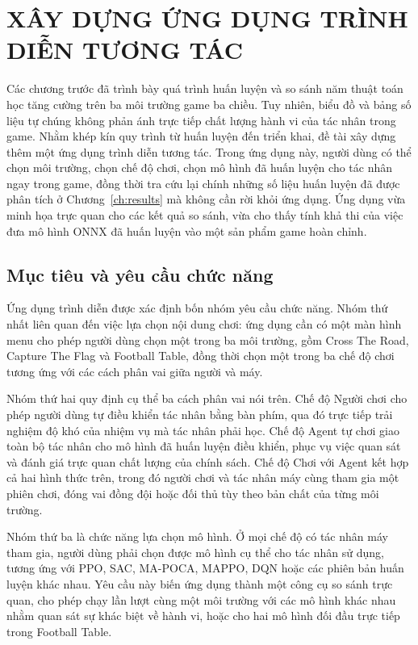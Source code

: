 \fontsize{13pt}{22.5pt}\selectfont

\clearpage
\section{XÂY DỰNG ỨNG DỤNG TRÌNH DIỄN TƯƠNG TÁC}
\label{ch:app}

\indent Các chương trước đã trình bày quá trình huấn luyện và so sánh năm thuật toán học
tăng cường trên ba môi trường game ba chiều. Tuy nhiên, biểu đồ và bảng số liệu tự chúng
không phản ánh trực tiếp chất lượng hành vi của tác nhân trong game. Nhằm khép kín quy
trình từ huấn luyện đến triển khai, đề tài xây dựng thêm một ứng dụng trình diễn tương
tác. Trong ứng dụng này, người dùng có thể chọn môi trường, chọn chế độ chơi, chọn mô hình
đã huấn luyện cho tác nhân ngay trong game, đồng thời tra cứu lại chính những số liệu
huấn luyện đã được phân tích ở Chương~\ref{ch:results} mà không cần rời khỏi ứng dụng. Ứng
dụng vừa minh họa trực quan cho các kết quả so sánh, vừa cho thấy tính khả thi của việc
đưa mô hình ONNX đã huấn luyện vào một sản phẩm game hoàn chỉnh.

\subsection{Mục tiêu và yêu cầu chức năng}
\label{sub:app-goal}

\indent Ứng dụng trình diễn được xác định bốn nhóm yêu cầu chức năng. Nhóm thứ nhất liên
quan đến việc lựa chọn nội dung chơi: ứng dụng cần có một màn hình menu cho phép người
dùng chọn một trong ba môi trường, gồm Cross The Road, Capture The Flag và Football Table,
đồng thời chọn một trong ba chế độ chơi tương ứng với các cách phân vai giữa người và máy.

\indent Nhóm thứ hai quy định cụ thể ba cách phân vai nói trên. Chế độ Người chơi
cho phép người dùng tự điều khiển tác nhân bằng bàn phím, qua đó trực tiếp trải nghiệm độ
khó của nhiệm vụ mà tác nhân phải học. Chế độ Agent tự chơi giao toàn bộ tác nhân
cho mô hình đã huấn luyện điều khiển, phục vụ việc quan sát và đánh giá trực quan chất
lượng của chính sách. Chế độ Chơi với Agent kết hợp cả hai hình thức trên, trong
đó người chơi và tác nhân máy cùng tham gia một phiên chơi, đóng vai đồng đội hoặc đối thủ
tùy theo bản chất của từng môi trường.

\indent Nhóm thứ ba là chức năng lựa chọn mô hình. Ở mọi chế độ có tác nhân máy tham gia,
người dùng phải chọn được mô hình cụ thể cho tác nhân sử dụng, tương ứng với PPO, SAC,
MA-POCA, MAPPO, DQN hoặc các phiên bản huấn luyện khác nhau. Yêu cầu này biến ứng dụng
thành một công cụ so sánh trực quan, cho phép chạy lần lượt cùng một môi trường với các mô
hình khác nhau nhằm quan sát sự khác biệt về hành vi, hoặc cho hai mô hình đối đầu trực
tiếp trong Football Table.

